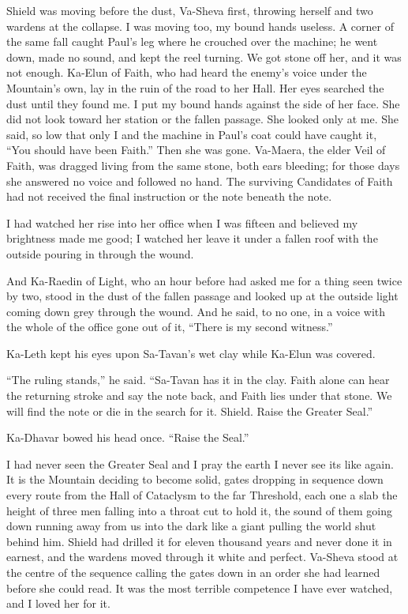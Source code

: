 Shield was moving before the dust, Va-Sheva first, throwing herself and two wardens at the collapse. I was moving too, my bound hands useless. A corner of the same fall caught Paul's leg where he crouched over the machine; he went down, made no sound, and kept the reel turning. We got stone off her, and it was not enough. Ka-Elun of Faith, who had heard the enemy's voice under the Mountain's own, lay in the ruin of the road to her Hall. Her eyes searched the dust until they found me. I put my bound hands against the side of her face. She did not look toward her station or the fallen passage. She looked only at me. She said, so low that only I and the machine in Paul's coat could have caught it, ``You should have been Faith.'' Then she was gone. Va-Maera, the elder Veil of Faith, was dragged living from the same stone, both ears bleeding; for those days she answered no voice and followed no hand. The surviving Candidates of Faith had not received the final instruction or the note beneath the note.\par

I had watched her rise into her office when I was fifteen and believed my brightness made me good; I watched her leave it under a fallen roof with the outside pouring in through the wound.\par

And Ka-Raedin of Light, who an hour before had asked me for a thing seen twice by two, stood in the dust of the fallen passage and looked up at the outside light coming down grey through the wound. And he said, to no one, in a voice with the whole of the office gone out of it, ``There is my second witness.''\par

\ornament

Ka-Leth kept his eyes upon Sa-Tavan's wet clay while Ka-Elun was covered.\par

``The ruling stands,'' he said. ``Sa-Tavan has it in the clay. Faith alone can hear the returning stroke and say the note back, and Faith lies under that stone. We will find the note or die in the search for it. Shield. Raise the Greater Seal.''\par

Ka-Dhavar bowed his head once. ``Raise the Seal.''\par

\ornament

I had never seen the Greater Seal and I pray the earth I never see its like again. It is the Mountain deciding to become solid, gates dropping in sequence down every route from the Hall of Cataclysm to the far Threshold, each one a slab the height of three men falling into a throat cut to hold it, the sound of them going down running away from us into the dark like a giant pulling the world shut behind him. Shield had drilled it for eleven thousand years and never done it in earnest, and the wardens moved through it white and perfect. Va-Sheva stood at the centre of the sequence calling the gates down in an order she had learned before she could read. It was the most terrible competence I have ever watched, and I loved her for it.\par

